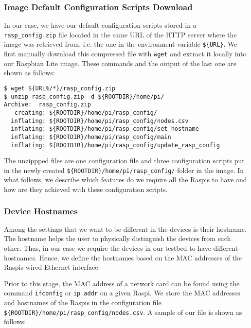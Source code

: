 \subsubsection{Image Default Configuration Scripts Download}
\label{sec:configuration_files_download}
In our case, we have our default configuration scripts stored in a
\texttt{rasp\_config.zip} file located in the same \ac{URL} of the
\ac{HTTP} server where the image was retrieved from, i.e. the one in
the environment variable \texttt{\$\{URL\}}. We first manually download
this compressed file with \texttt{wget} and extract it locally into our
Raspbian Lite image. These commands and the output of the last one are
shown as follows:

\begin{lstlisting}[]
$ wget ${URL%/*}/rasp_config.zip
$ unzip rasp_config.zip -d ${ROOTDIR}/home/pi/
Archive:  rasp_config.zip
   creating: ${ROOTDIR}/home/pi/rasp_config/
  inflating: ${ROOTDIR}/home/pi/rasp_config/nodes.csv
  inflating: ${ROOTDIR}/home/pi/rasp_config/set_hostname
  inflating: ${ROOTDIR}/home/pi/rasp_config/main
  inflating: ${ROOTDIR}/home/pi/rasp_config/update_rasp_config
\end{lstlisting}
\FloatBarrier
\vspace{-5mm}

The unzippped files are one configuration file and three configuration
scripts put in the newly created \texttt{\$\{ROOTDIR\}/home/pi/rasp\_config/}
folder in the image. In what follows, we describe which features do we
require all the \ac{Raspi}s to have and how are they achieved with
these configuration scripts.

\subsubsection{Device Hostnames}
Among the settings that we want to be different in the devices is
their hostname. The hostname helps the user to physically distinguish the
devices from each other. Thus, in our case we require the devices in our
testbed to have different hostnames. Hence, we define the hostnames based
on the \ac{MAC} addresses of the \ac{Raspi}s wired Ethernet interface.

Prior to this stage, the \ac{MAC} address of a network card can be found
using the command \texttt{ifconfig} or \texttt{ip addr} on a given
\ac{Raspi}. We store the \ac{MAC} addresses and hostnames of the
\ac{Raspi}s in the configuration file
\texttt{\$\{ROOTDIR\}/home/pi/rasp\_config/nodes.csv}. A sample of our file
is shown as follows:


